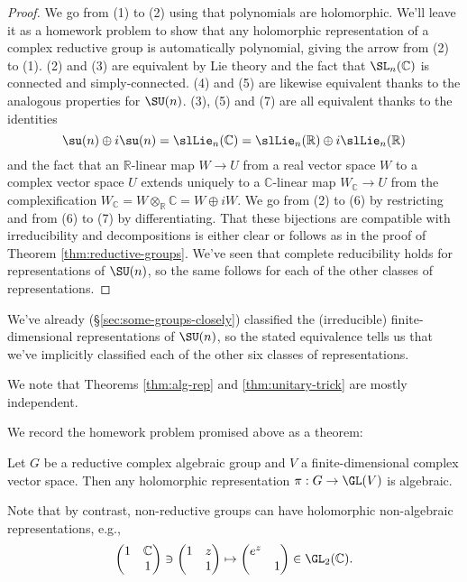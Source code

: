 \documentclass[reqno]{amsart} 
\begin{document}
\begin{proof}
  We go from (1) to (2) using that polynomials are holomorphic.  We'll leave it as a homework problem to show that any holomorphic representation of a complex reductive group is automatically polynomial, giving the arrow from (2) to (1).  (2) and (3) are equivalent by Lie theory and the fact that $\SL_n(\mathbb{C})$ is connected and simply-connected.  (4) and (5) are likewise equivalent thanks to the analogous properties for $\SU(n)$.  (3), (5) and (7) are all equivalent thanks to the identities
  \begin{equation*}
    \su(n) \oplus i \su(n) = \slLie_n(\mathbb{C})
    = \slLie_n(\mathbb{R}) \oplus i \slLie_n(\mathbb{R})
  \end{equation*}
  and the fact that an $\mathbb{R}$-linear map $W \rightarrow U$ from a real vector space $W$ to a complex vector space $U$ extends uniquely to a $\mathbb{C}$-linear map $W_{\mathbb{C}} \rightarrow U$ from the complexification $W_{\mathbb{C}} = W \otimes_{\mathbb{R}} \mathbb{C} = W \oplus i W$.  We go from (2) to (6) by restricting and from (6) to (7) by differentiating.  That these bijections are compatible with irreducibility and decompositions is either clear or follows as in the proof of Theorem \ref{thm:reductive-groups}.  We've seen that complete reducibility holds for representations of $\SU(n)$, so the same follows for each of the other classes of representations.
\end{proof}

We've already (\S\ref{sec:some-groups-closely}) classified the (irreducible) finite-dimensional representations of $\SU(n)$, so the stated equivalence tells us that we've implicitly classified each of the other six classes of representations.

We note that Theorems \ref{thm:alg-rep} and \ref{thm:unitary-trick} are mostly independent.

We record the homework problem promised above as a theorem:
\begin{theorem}
  Let $G$ be a reductive complex algebraic group and $V$ a finite-dimensional complex vector space.  Then any holomorphic representation $\pi : G \rightarrow \GL(V)$ is algebraic.
\end{theorem}
Note that by contrast, non-reductive groups can have holomorphic non-algebraic representations, e.g.,
\begin{equation*}
  \begin{pmatrix}
    1 & \mathbb{C}  \\
    & 1
  \end{pmatrix}
  \ni
  \begin{pmatrix}
    1 & z \\
    & 1
  \end{pmatrix}
  \mapsto
  \begin{pmatrix}
    e^z &  \\
    & 1
  \end{pmatrix}
  \in \GL_2(\mathbb{C}).
\end{equation*}
\end{document}

